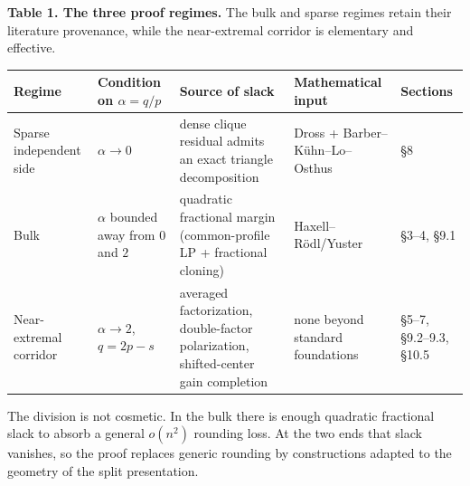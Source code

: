 \documentclass[english,11pt,a4paper]{article}
\newcounter{none}
\begin{document}
\textbf{Table 1. The three proof regimes.} The bulk and sparse regimes
retain their literature provenance, while the near-extremal corridor is
elementary and effective.

{\def\LTcaptype{none} %
\begin{longtable}[]{@{}
  >{\raggedright\arraybackslash}p{}
  >{\raggedright\arraybackslash}p{}
  >{\raggedright\arraybackslash}p{}
  >{\raggedright\arraybackslash}p{}
  >{\raggedright\arraybackslash}p{}@{}}
\toprule\noalign{}
\begin{minipage}[b]{\linewidth}\raggedright
Regime
\end{minipage} & \begin{minipage}[b]{\linewidth}\raggedright
Condition on \(\alpha=q/p\)
\end{minipage} & \begin{minipage}[b]{\linewidth}\raggedright
Source of slack
\end{minipage} & \begin{minipage}[b]{\linewidth}\raggedright
Mathematical input
\end{minipage} & \begin{minipage}[b]{\linewidth}\raggedright
Sections
\end{minipage} \\
\midrule\noalign{}
\endhead
\bottomrule\noalign{}
\endlastfoot
Sparse independent side & \(\alpha\to 0\) & dense clique residual admits
an exact triangle decomposition & Dross + Barber--Kühn--Lo--Osthus &
§8 \\
Bulk & \(\alpha\) bounded away from \(0\) and \(2\) & quadratic
fractional margin (common-profile LP + fractional cloning) &
Haxell--Rödl/Yuster & §3--4, §9.1 \\
Near-extremal corridor & \(\alpha\to 2\), \(q=2p-s\) & averaged
factorization, double-factor polarization, shifted-center gain
completion & none beyond standard foundations & §5--7, §9.2--9.3,
§10.5 \\
\end{longtable}
}

The division is not cosmetic. In the bulk there is enough quadratic
fractional slack to absorb a general \(o(n^2)\) rounding loss. At the
two ends that slack vanishes, so the proof replaces generic rounding by
constructions adapted to the geometry of the split presentation.
\end{document}
